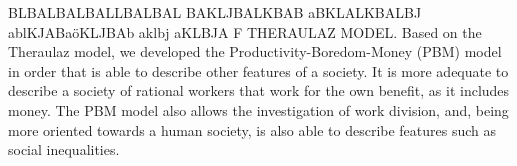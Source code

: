 BLBALBALBALLBALBAL BAKLJBALKBAB aBKLALKBALBJ ablKJABaöKLJBAb aklbj aKLBJA F THERAULAZ MODEL. Based on the Theraulaz model, we developed the Productivity-Boredom-Money (PBM) model in order that is able to describe other features of a society. It is more adequate to describe a society of rational workers that work for the own benefit, as it includes money. The PBM model also allows the investigation of work division, and, being more oriented towards a human society, is also able to describe features such as social inequalities.

